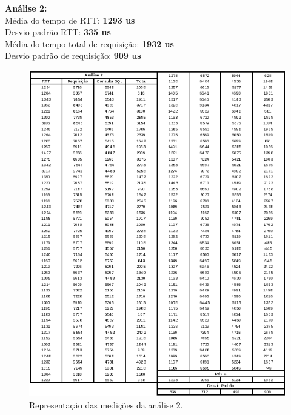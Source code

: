 \documentclass[11pt,twoside]{article}
\begin{document}
\textbf{Análise 2: }\\
Média do tempo de RTT: \textbf{1293 us}\\
Desvio padrão RTT: \textbf{335 us}\\
Média do tempo total de requisição: \textbf{1932 us}\\
Desvio padrão de requisição: \textbf{909 us}\\
\begin{figure}[htb]
  \centering
  \includegraphics[width=15cm]{analise2.png} 
  \caption{Representação das medições da análise 2.}
  \label{fig:analise2}
\end{figure}
\end{document}
